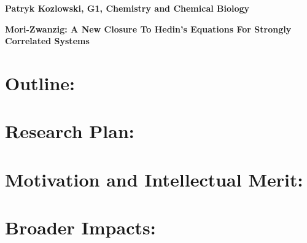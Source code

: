 \documentclass[11pt]{article} %
\begin{document}
\begin{center}
\large{\bf Patryk Kozlowski, G1, Chemistry and Chemical Biology}
\end{center}
\begin{center}
\large{\bf Mori-Zwanzig: A New Closure To Hedin's Equations For Strongly Correlated Systems}
\end{center}

\section*{Outline:}


\section*{Research Plan:}


\section*{Motivation and Intellectual Merit:}


\section*{Broader Impacts:}



\end{document}
